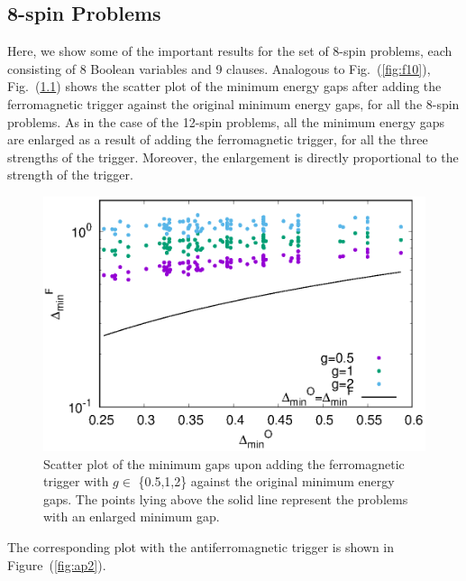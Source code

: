 \documentclass[../main.tex]{subfiles}
\begin{document}
\begin{appendices}

\chapter{8-spin Problems}
Here, we show some of the important results for the set of 8-spin problems, each consisting of 8 Boolean variables and 9 clauses. Analogous to Fig.~(\ref{fig:f10}), Fig.~(\ref{fig:ap1}) shows the scatter plot of the minimum energy gaps after adding the ferromagnetic trigger against the original minimum energy gaps, for all the 8-spin problems. As in the case of the 12-spin problems, all the minimum energy gaps are enlarged as a result of adding the ferromagnetic trigger, for all the three strengths of the trigger. Moreover, the enlargement is directly proportional to the strength of the trigger.

\begin{figure}[H]
\centering 
\includegraphics[scale=0.8]{Mingap_F_8.eps}
\caption{Scatter plot of the minimum gaps upon adding the ferromagnetic trigger with $g\in$ \{0.5,1,2\} against the original minimum energy gaps. The points lying above the solid line represent the problems with an enlarged minimum gap.}
\label{fig:ap1}
\end{figure}

The corresponding plot with the antiferromagnetic trigger is shown in Figure~(\ref{fig:ap2}).


\end{appendices}
\end{document}
